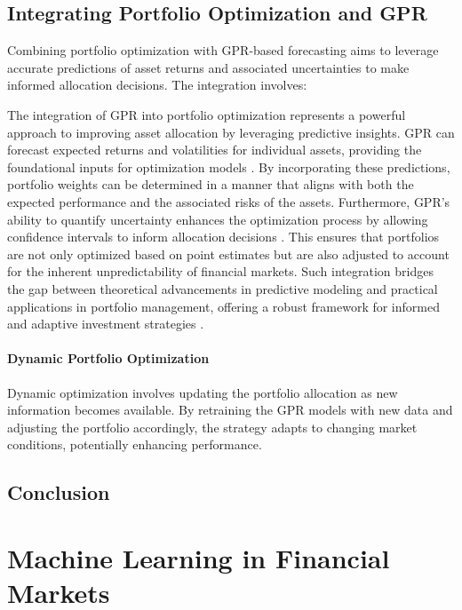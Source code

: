 \subsection{Integrating Portfolio Optimization and \ac{GPR}}

Combining portfolio optimization with GPR-based forecasting aims to leverage accurate predictions of asset returns and associated uncertainties to make informed allocation decisions. The integration involves:

The integration of GPR into portfolio optimization represents a powerful approach to improving asset allocation by leveraging predictive insights. 
GPR can forecast expected returns and volatilities for individual assets, providing the foundational inputs for optimization models \cite{deisenroth2015gaussian, cont2001empirical}. 
By incorporating these predictions, portfolio weights can be determined in a manner that aligns with both the expected performance and the associated risks of the assets. Furthermore, GPR's ability to quantify uncertainty enhances the optimization process by allowing confidence intervals to inform allocation decisions \cite{asmussen2007stochastic}. 
This ensures that portfolios are not only optimized based on point estimates but are also adjusted to account for the inherent unpredictability of financial markets. 
Such integration bridges the gap between theoretical advancements in predictive modeling and practical applications in portfolio management, offering a robust framework for informed and adaptive investment strategies \cite{markowitz1952portfolio}.
\paragraph{Dynamic Portfolio Optimization}

Dynamic optimization involves updating the portfolio allocation as new information becomes available. By retraining the GPR models with new data and adjusting the portfolio accordingly, the strategy adapts to changing market conditions, potentially enhancing performance.

\subsection{Conclusion}




\section{Machine Learning in Financial Markets}

